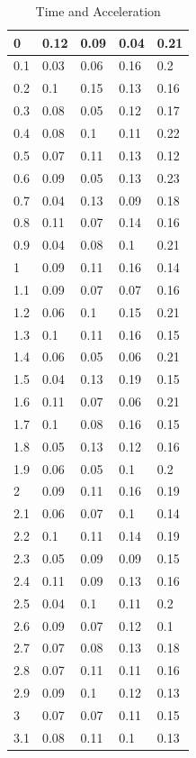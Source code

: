 \documentclass{article}
\begin{document}
\begin{table}[!ht]
	\centering
	\begin{tabular}{|l|l|l|l|l|}
		\hline
		0 & 0.12 & 0.09 & 0.04 & 0.21 \\ \hline
		0.1 & 0.03 & 0.06 & 0.16 & 0.2 \\ \hline
		0.2 & 0.1 & 0.15 & 0.13 & 0.16 \\ \hline
		0.3 & 0.08 & 0.05 & 0.12 & 0.17 \\ \hline
		0.4 & 0.08 & 0.1 & 0.11 & 0.22 \\ \hline
		0.5 & 0.07 & 0.11 & 0.13 & 0.12 \\ \hline
		0.6 & 0.09 & 0.05 & 0.13 & 0.23 \\ \hline
		0.7 & 0.04 & 0.13 & 0.09 & 0.18 \\ \hline
		0.8 & 0.11 & 0.07 & 0.14 & 0.16 \\ \hline
		0.9 & 0.04 & 0.08 & 0.1 & 0.21 \\ \hline
		1 & 0.09 & 0.11 & 0.16 & 0.14 \\ \hline
		1.1 & 0.09 & 0.07 & 0.07 & 0.16 \\ \hline
		1.2 & 0.06 & 0.1 & 0.15 & 0.21 \\ \hline
		1.3 & 0.1 & 0.11 & 0.16 & 0.15 \\ \hline
		1.4 & 0.06 & 0.05 & 0.06 & 0.21 \\ \hline
		1.5 & 0.04 & 0.13 & 0.19 & 0.15 \\ \hline
		1.6 & 0.11 & 0.07 & 0.06 & 0.21 \\ \hline
		1.7 & 0.1 & 0.08 & 0.16 & 0.15 \\ \hline
		1.8 & 0.05 & 0.13 & 0.12 & 0.16 \\ \hline
		1.9 & 0.06 & 0.05 & 0.1 & 0.2 \\ \hline
		2 & 0.09 & 0.11 & 0.16 & 0.19 \\ \hline
		2.1 & 0.06 & 0.07 & 0.1 & 0.14 \\ \hline
		2.2 & 0.1 & 0.11 & 0.14 & 0.19 \\ \hline
		2.3 & 0.05 & 0.09 & 0.09 & 0.15 \\ \hline
		2.4 & 0.11 & 0.09 & 0.13 & 0.16 \\ \hline
		2.5 & 0.04 & 0.1 & 0.11 & 0.2 \\ \hline
		2.6 & 0.09 & 0.07 & 0.12 & 0.1 \\ \hline
		2.7 & 0.07 & 0.08 & 0.13 & 0.18 \\ \hline
		2.8 & 0.07 & 0.11 & 0.11 & 0.16 \\ \hline
		2.9 & 0.09 & 0.1 & 0.12 & 0.13 \\ \hline
		3 & 0.07 & 0.07 & 0.11 & 0.15 \\ \hline
		3.1 & 0.08 & 0.11 & 0.1 & 0.13 \\ \hline
	\end{tabular}
	\caption{Time and Acceleration}
	\label{accln1}
\end{table}
\end{document}
